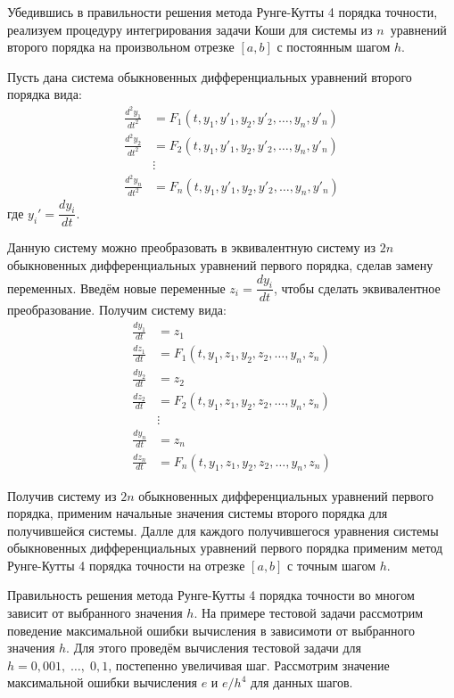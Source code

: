 \documentclass[a4paper,12pt]{article}
\begin{document}
{Убедившись в правильности решения метода Рунге-Кутты 4 порядка точности, реали\-зуем процедуру интегрирования задачи Коши для системы из $n$\
уравнений второго порядка на произвольном отрезке $[a,b]$ с постоянным шагом $h$.

Пусть дана система обыкновенных дифференциальных уравнений второго порядка вида:
\begin{equation*}
	\begin{aligned}
		\frac{{d^2 y_1}}{{dt^2}} &= F_1(t, y_1, y'_1, y_2, y'_2, \ldots, y_n, y'_n) \\
		\frac{{d^2 y_2}}{{dt^2}} &= F_2(t, y_1, y'_1, y_2, y'_2, \ldots, y_n, y'_n) \\
		&\vdots \\
		\frac{{d^2 y_n}}{{dt^2}} &= F_n(t, y_1, y'_1, y_2, y'_2, \ldots, y_n, y'_n)
	\end{aligned}
\end{equation*}
где $y_i' = \dfrac{dy_i}{dt}$.

Данную систему можно преобразовать в эквивалентную систему из $2n$ обыкновенных дифференциальных уравнений первого порядка, сделав замену переменных.
Введём новые переменные $z_i = \dfrac{dy_i}{dt}$, чтобы сделать эквивалентное преобразование. Получим систему вида:
\begin{equation*}
	\begin{aligned}
		\frac{{dy_1}}{{dt}} &= z_1 \\
		\frac{{dz_1}}{{dt}} &= F_1(t, y_1, z_1, y_2, z_2, \ldots, y_n, z_n) \\
		\frac{{dy_2}}{{dt}} &= z_2 \\
		\frac{{dz_2}}{{dt}} &= F_2(t, y_1, z_1, y_2, z_2, \ldots, y_n, z_n) \\
		&\vdots \\
		\frac{{dy_n}}{{dt}} &= z_n \\
		\frac{{dz_n}}{{dt}} &= F_n(t, y_1, z_1, y_2, z_2, \ldots, y_n, z_n)
	\end{aligned}
\end{equation*}

Получив систему из $2n$ обыкновенных дифференциальных уравнений первого порядка, при\-ме\-ним начальные значения системы второго порядка для получившейся системы.
Далле для каждого получившегося уравнения системы обыкновенных дифференциальных уравне\-ний первого порядка применим метод Рунге-Кутты 4 порядка точности на отрезке $[a,b]$ с точным шагом $h$.

Правильность решения метода Рунге-Кутты 4 порядка точности во многом зависит от выбранного значения $h$. На примере тестовой задачи рассмотрим поведение максимальной ошибки вычисления в зависимоти от выбранного значения $h$.
Для этого проведём вычисления тестовой задачи для $h = 0,001,\;\dots,\;0,1$, постепенно увеличивая шаг. Рассмотрим значение максимальной ошибки вычисления $e$ и $e/h^4$ для данных шагов.

}
\end{document}
